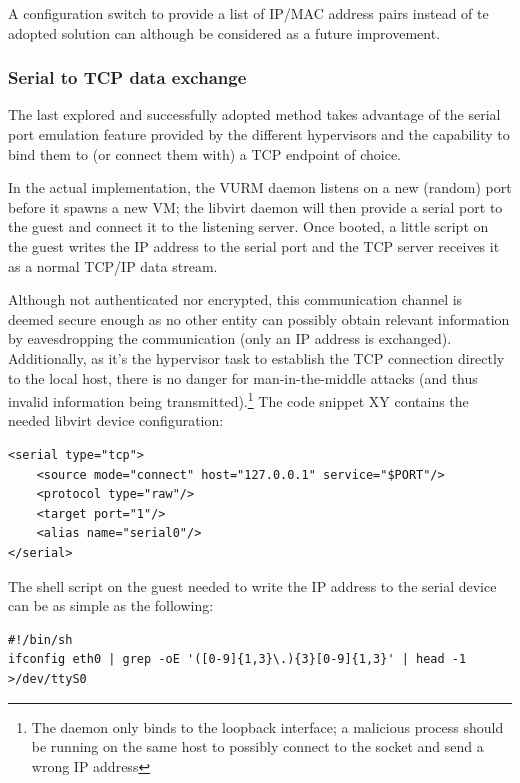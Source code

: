 A configuration switch to provide a list of IP/MAC address pairs instead of te adopted solution can although be considered as a future improvement.


\subsubsection{Serial to TCP data exchange}

The last explored and successfully adopted method takes advantage of the serial port emulation feature provided by the different hypervisors and the capability to bind them to (or connect them with) a TCP endpoint of choice.

In the actual implementation, the VURM daemon listens on a new (random) port before it spawns a new VM; the libvirt daemon will then provide a serial port to the guest and connect it to the listening server. Once booted, a little script on the guest writes the IP address to the serial port and the TCP server receives it as a normal TCP/IP data stream.

Although not authenticated nor encrypted, this communication channel is deemed secure enough as no other entity can possibly obtain relevant information by eavesdropping the communication (only an IP address is exchanged). Additionally, as it's the hypervisor task to establish the TCP connection directly to the local host, there is no danger for man-in-the-middle attacks (and thus invalid information being transmitted).\footnote{The daemon only binds to the loopback interface; a malicious process should be running on the same host to possibly connect to the socket and send a wrong IP address}
The code snippet XY contains the needed libvirt device configuration:

\lstset{language=xml,caption=Libvirt TCP to serial port device description,label=lst:serialtcp}
\begin{lstlisting}
<serial type="tcp">
    <source mode="connect" host="127.0.0.1" service="$PORT"/>
    <protocol type="raw"/>
    <target port="1"/>
    <alias name="serial0"/>
</serial>
\end{lstlisting}

The shell script on the guest needed to write the IP address to the serial device can be as simple as the following:

\lstset{language=bash,caption=Shell script to write the IP address to the serial port,label=lst:serialip}
\begin{lstlisting}
#!/bin/sh
ifconfig eth0 | grep -oE '([0-9]{1,3}\.){3}[0-9]{1,3}' | head -1 >/dev/ttyS0
\end{lstlisting}

